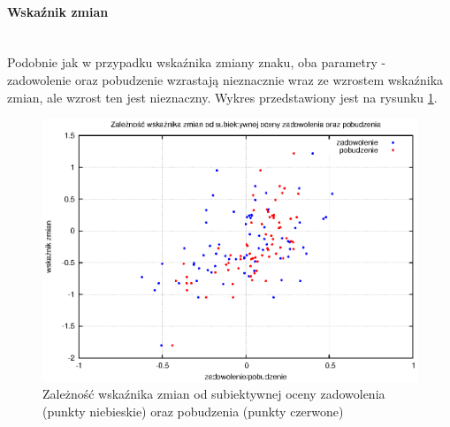 \paragraph{Wskaźnik zmian}\mbox{}\\
Podobnie jak w przypadku wskaźnika zmiany znaku, oba parametry - zadowolenie oraz pobudzenie wzrastają nieznacznie wraz ze wzrostem wskaźnika zmian, ale wzrost ten jest nieznaczny. Wykres przedstawiony jest na rysunku \ref{wykresOnset}.
\begin{figure}[ht!]
\centering
\includegraphics[scale=\imageSize]{res/onset.eps}
\caption{Zależność wskaźnika zmian od subiektywnej oceny zadowolenia (punkty niebieskie) oraz pobudzenia (punkty czerwone)\label{wykresOnset}}
\end{figure}
